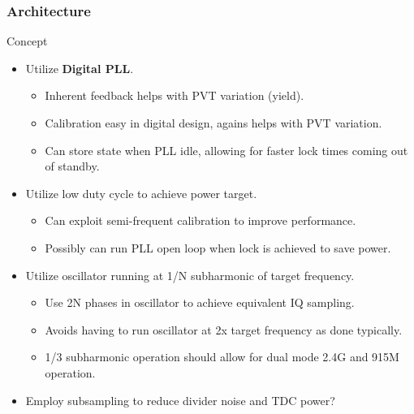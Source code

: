 \documentclass[t, screen, aspectratio=43]{beamer}
\begin{document}
\begin{frame}
	\frametitle{Architecture}
	\begin{block}{Concept}
		\begin{itemize}
			\footnotesize
			\item Utilize \textbf{Digital PLL}.\@ 
			\begin{itemize}
				\footnotesize
				\item Inherent feedback helps with PVT variation (yield).
				\item Calibration easy in digital design, agains helps with PVT variation.
				\item Can store state when PLL idle, allowing for faster lock times coming out of standby.
			\end{itemize}       
		  \item Utilize low duty cycle to achieve power target.     
			\begin{itemize}
				\footnotesize
				\item Can exploit semi-frequent calibration to improve performance.
				\item Possibly can run PLL open loop when lock is achieved to save power.
			\end{itemize} 
		  \item Utilize oscillator running at 1/N subharmonic of target frequency.
			\begin{itemize}
				\footnotesize
				\item Use 2N phases in oscillator to achieve equivalent IQ sampling.
				\item Avoids having to run oscillator at 2x target frequency as done typically.
				\item 1/3 subharmonic operation should allow for dual mode 2.4G and 915M operation.
			\end{itemize} 
			\item Employ subsampling to reduce divider noise and TDC power?
		\end{itemize}
	\end{block}    

\end{frame}

\end{document}
